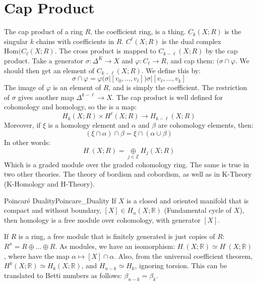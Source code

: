\section{Cap Product}
    The cap product of a ring $R$, the coefficient ring,
    is a thing. $C_{k}(X;R)$ is the singular $k$ chains with
    coefficients in $R$. $C^{\ell}(X;R)$ is the dual complex
    $\mathrm{Hom}(C_{\ell}(X;R)$. The cross product is mapped
    to $C_{k-\ell}(X;R)$ by the cap product. Take a generator
    $\sigma:\Delta^{K}\rightarrow{X}$ and
    $\varphi:C_{\ell}\rightarrow{R}$, and cap them:
    $(\sigma\cap\varphi$. We should then get an element of
    $C_{k-\ell}(X;R)$. We define this by:
    \begin{equation}
        \sigma\cap\varphi
        =\varphi(\sigma|[v_{0},\dots,v_{\ell}])
            \sigma|[v_{\ell},\dots,v_{k}]
    \end{equation}
    The image of $\varphi$ is an element of $R$, and is simply
    the coefficient. The restriction of $\sigma$ gives another
    map $\Delta^{k-\ell}\rightarrow{X}$. The cap product is well
    defined for cohomology and homology, so the is a map:
    \begin{equation}
        H_{k}(X;R)\times{H}^{\ell}(X;R)\rightarrow
            H_{k-\ell}(X;R)
    \end{equation}
    Moreover, if $\xi$ is a homology element and $\alpha$ and
    $\beta$ are cohomology elements, then:
    \begin{equation}
        (\xi\cap\alpha)\cap\beta=\xi\cap(\alpha\cup\beta)
    \end{equation}
    In other words:
    \begin{equation}
        H_{\cdot}(X;R)=\underset{j\in\mathbb{Z}}{\oplus}
            H_{j}(X;R)
    \end{equation}
    Which is a graded module over the graded cohomology ring.
    The same is true in two other theories. The theory of
    bordism and cobordism, as well as in K-Theory
    (K-Homology and H-Theory).
    \begin{ltheorem}{Poincar\'{e} Duality}{Poincare_Duality}
        If $X$ is a closed and oriented manifold that is
        compact and without boundary,
        $[X]\in{H}_{n}(X;\mathbb{R})$ (Fundamental cycle of $X$),
        then homology is a free module over cohomology, with
        generator $[X]$.
    \end{ltheorem}
    If $R$ is a ring, a free module that is finitely generated
    is just copies of $R$: $R^{n}=R\oplus\dots\oplus{R}$. As
    modules, we have an isomorphism:
    $H_{\cdot}(X;\mathbb{R})\simeq{H}^{\cdot}(X;\mathbb{R})$,
    where have the map $\alpha\mapsto[X]\cap\alpha$. Also, from
    the universal coefficient theorem,
    $H^{k}(X;\mathbb{R})\simeq{H}_{k}(X;\mathbb{R})$, and
    $H_{n-k}\simeq{H}_{k}$, ignoring torsion. This can be
    translated to Betti numbers as follows:
    $\beta_{n-k}=\beta_{k}$.
